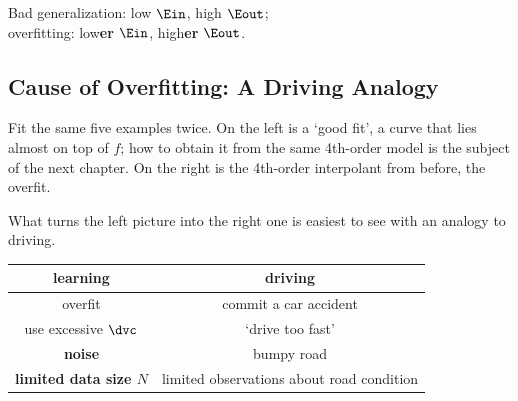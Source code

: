 \begin{moral}
    Bad generalization: low \(\Ein\), high \(\Eout\);\\
    overfitting: low\textbf{er} \(\Ein\), high\textbf{er} \(\Eout\).
\end{moral}

\subsection{Cause of Overfitting: A Driving Analogy}

Fit the same five examples twice. On the left is a `good fit', a curve that
lies almost on top of \(f\); how to obtain it from the same 4th-order model is
the subject of the next chapter. On the right is the 4th-order interpolant from
before, the overfit.

\begin{center}
\end{center}

What turns the left picture into the right one is easiest to see with an
analogy to driving.

\begin{center}
    \solidrules
    \begin{tabular}{c|c}
        \toprule
        learning & driving\\
        \midrule
        overfit & commit a car accident\\
        use excessive \(\dvc\) & `drive too fast'\\
        \textbf{noise} & bumpy road\\
        \textbf{limited data size \(N\)} & limited observations about road
        condition\\
        \bottomrule
    \end{tabular}
\end{center}

